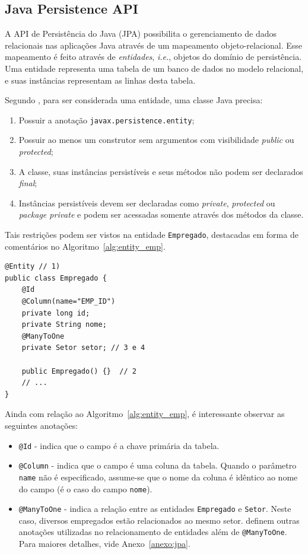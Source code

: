 \documentclass[
  10.5pt,				  %
	openright,			%
	twoside,			  %
  a5paper,
  chapter=TITLE,	%
	section=TITLE,	%
  hyphens,        %
	english,        %
	brazil          %
]{abntex2}
\begin{document}
\subsection{Java Persistence API}\label{sec:jpa}

A API de Persistência do Java (JPA) possibilita o gerenciamento de dados relacionais nas aplicações Java através de um mapeamento objeto-relacional. Esse mapeamento é feito através de \emph{entidades}, \emph{i.e.}, objetos do domínio de persistência. Uma entidade representa uma tabela de um banco de dados no modelo relacional, e suas instâncias representam as linhas desta tabela. 

Segundo , para ser considerada uma entidade, uma classe Java precisa:

\begin{enumerate}
  \item Possuir a anotação \texttt{javax.persistence.entity};
  \item Possuir ao menos um construtor sem argumentos com visibilidade \emph{public} ou \emph{protected};
  \item A classe, suas instâncias persistíveis e seus métodos não podem ser declarados \emph{final};
  \item Instâncias persistíveis devem ser declaradas como \emph{private}, \emph{protected} ou \emph{package private} e podem ser acessadas somente através dos métodos da classe.
\end{enumerate}

Tais restrições podem ser vistos na entidade \texttt{Empregado}, destacadas em forma de comentários no Algoritmo~\ref{alg:entity_emp}.

\begin{lstlisting}[caption={Entidade Empregado e seus mapeamentos.}, label={alg:entity_emp}]
@Entity // 1)
public class Empregado {
    @Id
    @Column(name="EMP_ID")
    private long id;
    private String nome;
    @ManyToOne
    private Setor setor; // 3 e 4
    
    public Empregado() {}  // 2
    // ...
}
\end{lstlisting}
%
Ainda com relação ao Algoritmo~\ref{alg:entity_emp}, é interessante observar as seguintes anotações:

\begin{itemize}
  \item \texttt{@Id} - indica que o campo é a chave primária da tabela.
  \item \texttt{@Column} - indica que o campo é uma coluna da tabela. Quando o parâmetro \texttt{name} não é especificado, assume-se que o nome da coluna é idêntico ao nome do campo (é o caso do campo \texttt{nome}).
  \item \texttt{@ManyToOne} - indica a relação entre as entidades \texttt{Empregado} e \texttt{Setor}. Neste caso, diversos empregados estão relacionados ao mesmo setor.  definem outras anotações utilizadas no relacionamento de entidades além de \texttt{@ManyToOne}. Para maiores detalhes, vide Anexo~\ref{anexo:jpa}.
\end{itemize}
\end{document}
